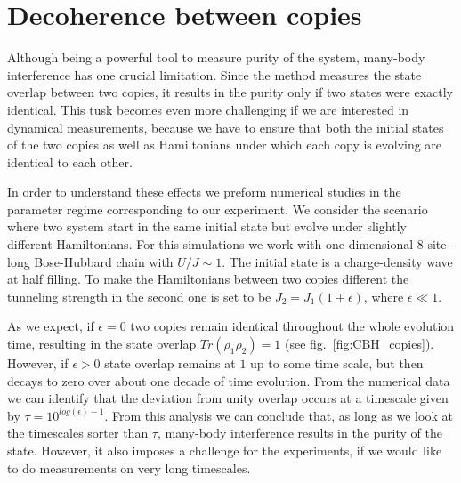 \section{Decoherence between copies}
Although being a powerful tool to measure purity of the system, many-body interference has one crucial limitation. Since the method measures the state overlap between two copies, it results in the purity only if two states were exactly identical. This tusk becomes even more challenging if we are interested in dynamical measurements, because we have to ensure that both the initial states of the two copies as well as Hamiltonians under which each copy is evolving are identical to each other.

In order to understand these effects we preform numerical studies in the parameter regime corresponding to our experiment. We consider the scenario where two system start in the same initial state but evolve under slightly different Hamiltonians. For this simulations we work with one-dimensional $8$ site-long Bose-Hubbard chain with $U/J\sim1$. The initial state is a charge-density wave at half filling. To make the Hamiltonians between two copies different the tunneling strength in the second one is set to be $J_2 = J_1(1+\epsilon)$, where $\epsilon \ll 1$. 

As we expect, if $\epsilon = 0$ two copies remain identical throughout the whole evolution time, resulting in the state overlap $Tr(\rho_1 \rho_2) = 1$ (see fig.~\ref{fig:CBH_copies}). However, if $\epsilon > 0$ state overlap remains at $1$ up to some time scale, but then decays to zero over about one decade of time evolution. From the numerical data we can identify that the deviation from unity overlap occurs at a timescale given by $\tau = 10^{log(\epsilon)-1}$. From this analysis we can conclude that, as long as we look at the timescales sorter than $\tau$, many-body interference results in the purity of the state. However, it also imposes a challenge for the experiments, if we would like to do measurements on very long timescales.



